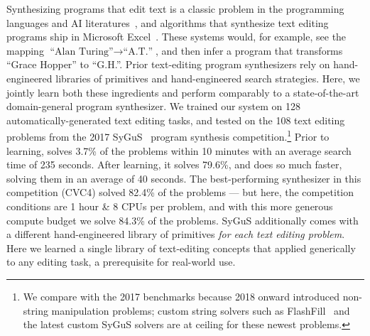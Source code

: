 \documentclass[12pt]{article}
\begin{document}
Synthesizing programs that edit text is a classic problem in the
programming languages and AI literatures~\cite{lau2003programming},
and algorithms that synthesize text editing programs ship in Microsoft
Excel~\cite{gulwani2011automating}.
These systems would, for example, %
see the mapping $\text{``Alan Turing''}\to\text{``A.T.''}$,
and then infer a program that transforms ``Grace Hopper'' to ``G.H.''.
Prior text-editing program synthesizers rely on
hand-engineered libraries of primitives and hand-engineered search strategies.  Here, we
jointly learn both these ingredients and perform comparably to
a state-of-the-art domain-general program synthesizer. %
We trained our system on 128 automatically-generated text editing
tasks, and tested %
on the 108 text editing problems from the 2017
SyGuS~\cite{alur2017sygus} program synthesis
competition.\footnote{We compare with the 2017 benchmarks because 2018 onward introduced non-string manipulation problems; custom string solvers such as FlashFill~\cite{gulwani2011automating} and the latest custom SyGuS solvers are at ceiling for these newest problems.} Prior to learning, \system solves 3.7\% of
the problems within 10 minutes with an average search time of 235
seconds.  After learning, it solves 79.6\%, and does so much faster,
solving them in an average of 40 seconds.
The best-performing
synthesizer in this competition (CVC4) solved 82.4\% of the problems
--- but here, the competition conditions are 1 hour \& 8 CPUs per
problem, and with this more generous compute budget we solve 84.3\% of
the problems.  SyGuS additionally comes with a different
hand-engineered library of primitives \emph{for each text editing
  problem}. %
Here we learned a single
  library of text-editing concepts that applied generically to any editing task, a prerequisite for real-world use.
\end{document}
